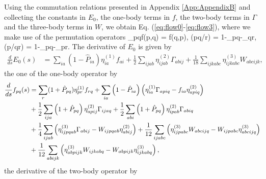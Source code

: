  Using the commutation relations presented in Appendix \ref{App:AppendixB} and collecting the constants in $E_0$, the one-body terms in $f$, the two-body terms in $\Gamma$ and the three-body terms in $W$, we obtain Eq. (\ref{eq:flow0}-\ref{eq:flow3}), where we make use of the permutation operators
\be
{}_{pq}f(p,q) = f(q,p), \quad {}(pq/r) = 1-_{pq}-_{qr}, \quad {}(p/qr) = 1-_{pq}-_{pr}.
\ee
The derivative of $E_0$ is given by
\begin{align}
\frac{d}{ds} E_0(s) &= \sum_{ia} (1-\hat{P}_{ia}) \eta_{ia}^{(1)} f_{ai} + \frac{1}{2}\sum_{ijab}\eta_{ijab}^{(2)}\Gamma_{abij}+ \frac{1}{18}\sum_{ijkabc} \eta_{ijkabc}^{(3)} W_{abcijk}, 
\label{eq:flow0}
\end{align}
the one of the one-body operator by
\begin{align}
\frac{d}{ds}f_{pq}(s) &= \sum_r (1+\hat{P}_{pq}) \eta_{pr}^{(1)}f_{rq} + \sum_{ia}\lb 1-\hat{P}_{ia}\rb\lb \eta_{ia}^{(1)}\Gamma_{apiq} - f_{ia}\eta_{apiq}^{(2)}\rb \notag \\
& + \frac{1}{2}\sum_{ija}\lb 1+\hat{P}_{pq} \rb \eta_{apij}^{(2)}\Gamma_{ijaq} + \frac{1}{2}\sum_{abi}\lb 1+\hat{P}_{pq}  \rb \eta_{ipab}^{(2)}\Gamma_{abiq} \notag \\
& + \frac{1}{4}\sum_{ijab}\lb \eta_{ijpqab}^{(3)}\Gamma_{abij} - W_{ijpqab}\eta_{abij}^{(2)}\rb + \frac{1}{12}\sum_{ijabc}\lb \eta_{ijpabc}^{(3)} W_{abcijq} - W_{ijpabc} \eta_{abcijq}^{(3)} \rb \notag \\ & + 
\frac{1}{12}\sum_{abijk}\lb \eta_{abpijk}^{(3)} W_{ijkabq} - W_{abpijk} \eta_{ijkabq}^{(3)} \rb,
\label{eq:flow1} 
\end{align}
the derivative of the two-body operator by
